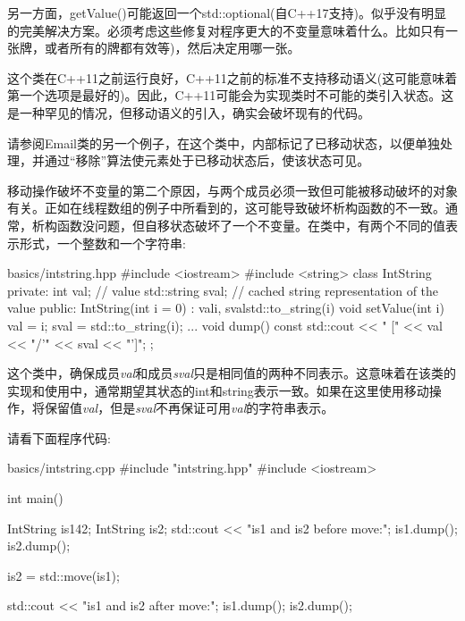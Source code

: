 另一方面，getValue()可能返回一个std::optional(自C++17支持)。似乎没有明显的完美解决方案。必须考虑这些修复对程序更大的不变量意味着什么。比如只有一张牌，或者所有的牌都有效等)，然后决定用哪一张。\par

这个类在C++11之前运行良好，C++11之前的标准不支持移动语义(这可能意味着第一个选项是最好的)。因此，C++11可能会为实现类时不可能的类引入状态。这是一种罕见的情况，但移动语义的引入，确实会破坏现有的代码。\par

请参阅Email类的另一个例子，在这个类中，内部标记了已移动状态，以便单独处理，并通过“移除”算法使元素处于已移动状态后，使该状态可见。\par


移动操作破坏不变量的第二个原因，与两个成员必须一致但可能被移动破坏的对象有关。正如在线程数组的例子中所看到的，这可能导致破坏析构函数的不一致。通常，析构函数没问题，但自移状态破坏了一个不变量。在类中，有两个不同的值表示形式，一个整数和一个字符串:\par

\begin{codeboxt}[cpp]{basics/intstring.hpp}
#include <iostream>
#include <string>
class IntString
{
  private:
  int val; // value
  std::string sval; // cached string representation of the value
  public:
  IntString(int i = 0)
  : val{i}, sval{std::to_string(i)} {
  }
  void setValue(int i) {
    val = i;
    sval = std::to_string(i);
  }
  ...
  void dump() const {
    std::cout << " [" << val << "/'" << sval << "']\n";
  }
};
\end{codeboxt}

这个类中，确保成员\textit{val}和成员\textit{sval}只是相同值的两种不同表示。这意味着在该类的实现和使用中，通常期望其状态的int和string表示一致。如果在这里使用移动操作，将保留值\textit{val}，但是\textit{sval}不再保证可用\textit{val}的字符串表示。\par

请看下面程序代码:\par

\begin{codeboxt}[cpp]{basics/intstring.cpp}
#include "intstring.hpp"
#include <iostream>

int main()
{
  IntString is1{42};
  IntString is2;
  std::cout << "is1 and is2 before move:\n";
  is1.dump();
  is2.dump();

  is2 = std::move(is1);

  std::cout << "is1 and is2 after move:\n";
  is1.dump();
  is2.dump();
}
\end{codeboxt}

